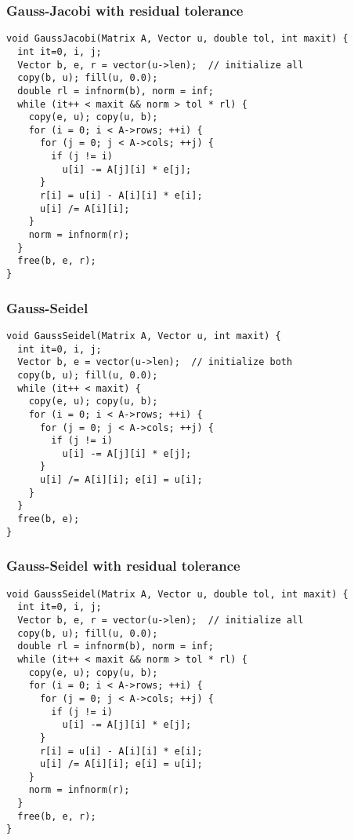 \begin{frame}[fragile]
  \frametitle{Gauss-Jacobi with residual tolerance}
\begin{lstlisting}[style=c, basicstyle=\ttfamily\scriptsize]
void GaussJacobi(Matrix A, Vector u, double tol, int maxit) {
  int it=0, i, j;
  Vector b, e, r = vector(u->len);  // initialize all
  copy(b, u); fill(u, 0.0);
  double rl = infnorm(b), norm = inf;
  while (it++ < maxit && norm > tol * rl) {
    copy(e, u); copy(u, b);
    for (i = 0; i < A->rows; ++i) {
      for (j = 0; j < A->cols; ++j) {
        if (j != i)
          u[i] -= A[j][i] * e[j];
      }
      r[i] = u[i] - A[i][i] * e[i];
      u[i] /= A[i][i];
    }
    norm = infnorm(r);
  }
  free(b, e, r);
}
\end{lstlisting}
\end{frame}

\begin{frame}[fragile]
  \frametitle{Gauss-Seidel}
\begin{lstlisting}[style=c, basicstyle=\ttfamily\scriptsize]
void GaussSeidel(Matrix A, Vector u, int maxit) {
  int it=0, i, j;
  Vector b, e = vector(u->len);  // initialize both
  copy(b, u); fill(u, 0.0);
  while (it++ < maxit) {
    copy(e, u); copy(u, b);
    for (i = 0; i < A->rows; ++i) {
      for (j = 0; j < A->cols; ++j) {
        if (j != i)
          u[i] -= A[j][i] * e[j];
      }
      u[i] /= A[i][i]; e[i] = u[i];
    }
  }
  free(b, e);
}
\end{lstlisting}
\end{frame}

\begin{frame}[fragile]
  \frametitle{Gauss-Seidel with residual tolerance}
\begin{lstlisting}[style=c, basicstyle=\ttfamily\scriptsize]
void GaussSeidel(Matrix A, Vector u, double tol, int maxit) {
  int it=0, i, j;
  Vector b, e, r = vector(u->len);  // initialize all
  copy(b, u); fill(u, 0.0);
  double rl = infnorm(b), norm = inf;
  while (it++ < maxit && norm > tol * rl) {
    copy(e, u); copy(u, b);
    for (i = 0; i < A->rows; ++i) {
      for (j = 0; j < A->cols; ++j) {
        if (j != i)
          u[i] -= A[j][i] * e[j];
      }
      r[i] = u[i] - A[i][i] * e[i];
      u[i] /= A[i][i]; e[i] = u[i];
    }
    norm = infnorm(r);
  }
  free(b, e, r);
}
\end{lstlisting}
\end{frame}

